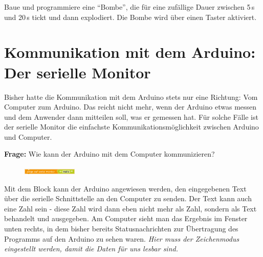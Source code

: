 \medskip
\begin{projekt}\label{proj:bombe}
	Baue und programmiere eine \enquote{Bombe}, die für eine zufällige Dauer zwischen 5\,s und 20\,s tickt und dann explodiert. Die Bombe wird über einen Taster aktiviert.
\end{projekt}
\vspace{-\baselineskip}

\section{Kommunikation mit dem Arduino: Der serielle Monitor}
\label{sec:seriellermonitor}
Bisher hatte die Kommunikation mit dem Arduino stets nur eine Richtung: Vom Computer zum Arduino. Das reicht nicht mehr, wenn der Arduino etwas messen und dem Anwender dann mitteilen soll, was er gemessen hat. Für solche Fälle ist der serielle Monitor die einfachste Kommunikationsmöglichkeit zwischen Arduino und Computer.

\begin{ziel}
	\textbf{Frage:} Wie kann der Arduino mit dem Computer kommunizieren?
\end{ziel}

\begin{figure}
	\centering
	\includegraphics[width=0.23\textwidth]{pics/serialprint.png}
\end{figure}
Mit dem Block  kann der Arduino angewiesen werden, den eingegebenen Text über die serielle Schnittstelle an den Computer zu senden. Der Text kann auch eine Zahl sein - diese Zahl wird dann eben nicht mehr als Zahl, sondern als Text behandelt und ausgegeben. Am Computer sieht man das Ergebnis im Fenster unten rechts, in dem bisher bereits Statusnachrichten zur Übertragung des Programms auf den Arduino zu sehen waren. \emph{Hier muss der Zeichenmodus eingestellt werden, damit die Daten für uns lesbar sind.}

